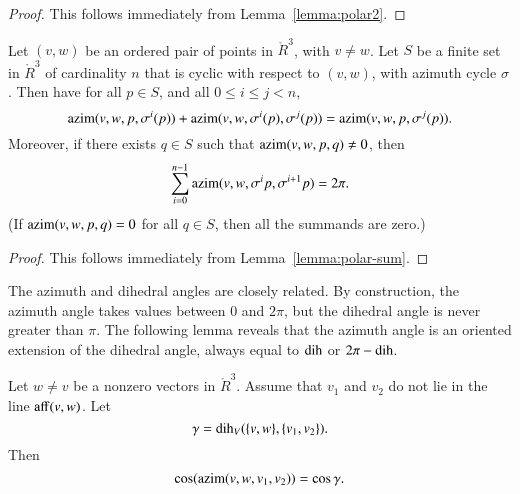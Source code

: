\begin{proof} This follows immediately from Lemma~\ref{lemma:polar2}.
\end{proof}

\begin{lemma} \label{lemma:2pi-sum}
Let $(v,w)$ be an ordered pair of points in $\ring{R}^3$,
with $v\ne w$.  Let $S$ be a finite set in $\ring{R}^3$ of
cardinality $n$ that
is cyclic with respect to $(v,w)$,
with azimuth cycle $\sigma$.
Then have for all $p\in S$,
and all $0\le i \le j < n$,
   $$
   {\operatorname{azim}}(v,w,p,\sigma^i(p)) +
    {\operatorname{azim}}(v,w,\sigma^i(p),\sigma^j(p)) =
   {\operatorname{azim}}(v,w,p,\sigma^j(p)).
   $$
Moreover, if there exists $q\in S$ such that 
${\operatorname{azim}}(v,w,p,q)\ne0$,
then
  $$
  \sum_{i=0}^{n-1} {\operatorname{azim}}(v,w,\sigma^ip,\sigma^{i+1}p) = 2\pi.
  $$
(If ${\operatorname{azim}}(v,w,p,q)=0$ for all $q\in S$, then all the
summands are zero.)
\end{lemma}

\begin{proof} This follows immediately from 
Lemma~\ref{lemma:polar-sum}.
\end{proof}


The azimuth and dihedral angles are closely related.   By construction,
the azimuth angle takes values between $0$ and $2\pi$, but the dihedral
angle is never greater than $\pi$.  The following lemma reveals that
the azimuth angle is an oriented extension of the dihedral angle, always
equal to $\operatorname{dih}$ or $2\pi - \operatorname{dih}$.


\begin{lemma}\label{lemma:dih-azim}
Let $w\ne v$ be a nonzero vectors in $\ring{R}^3$.
  Assume that $v_1$ and $v_2$ do not lie in the line ${\operatorname{aff}}(v,w)$.
Let
  $$\gamma = \operatorname{dih}_V(\{v,w\},\{v_1,v_2\}).$$
  Then
    $$
    \cos({\operatorname{azim}}(v,w,v_1,v_2)) = \cos\gamma.
    $$
\end{lemma}

